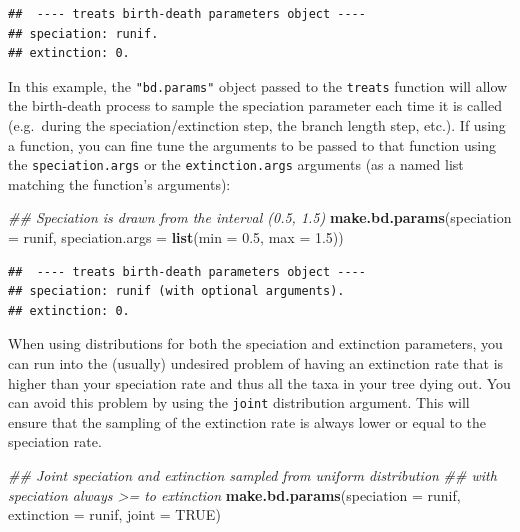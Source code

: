 \documentclass[
]{book}
\newenvironment{Shaded}{\begin{snugshade}}{\end{snugshade}}
\newcommand{\CommentTok}[1]{\textcolor[rgb]{0.56,0.35,0.01}{\textit{#1}}}
\newcommand{\DataTypeTok}[1]{\textcolor[rgb]{0.13,0.29,0.53}{#1}}
\newcommand{\FloatTok}[1]{\textcolor[rgb]{0.00,0.00,0.81}{#1}}
\newcommand{\KeywordTok}[1]{\textcolor[rgb]{0.13,0.29,0.53}{\textbf{#1}}}
\newcommand{\NormalTok}[1]{#1}
\newcommand{\OtherTok}[1]{\textcolor[rgb]{0.56,0.35,0.01}{#1}}
\begin{document}
\begin{verbatim}
##  ---- treats birth-death parameters object ---- 
## speciation: runif.
## extinction: 0.
\end{verbatim}

In this example, the \texttt{"bd.params"} object passed to the \texttt{treats} function will allow the birth-death process to sample the speciation parameter each time it is called (e.g.~during the speciation/extinction step, the branch length step, etc.).
If using a function, you can fine tune the arguments to be passed to that function using the \texttt{speciation.args} or the \texttt{extinction.args} arguments (as a named list matching the function's arguments):

\begin{Shaded}
\begin{Highlighting}[]
\CommentTok{\#\# Speciation is drawn from the interval (0.5, 1.5)}
\KeywordTok{make.bd.params}\NormalTok{(}\DataTypeTok{speciation =}\NormalTok{ runif,}
               \DataTypeTok{speciation.args =} \KeywordTok{list}\NormalTok{(}\DataTypeTok{min =} \FloatTok{0.5}\NormalTok{, }\DataTypeTok{max =} \FloatTok{1.5}\NormalTok{))}
\end{Highlighting}
\end{Shaded}

\begin{verbatim}
##  ---- treats birth-death parameters object ---- 
## speciation: runif (with optional arguments).
## extinction: 0.
\end{verbatim}

When using distributions for both the speciation and extinction parameters, you can run into the (usually) undesired problem of having an extinction rate that is higher than your speciation rate and thus all the taxa in your tree dying out.
You can avoid this problem by using the \texttt{joint} distribution argument.
This will ensure that the sampling of the extinction rate is always lower or equal to the speciation rate.

\begin{Shaded}
\begin{Highlighting}[]
\CommentTok{\#\# Joint speciation and extinction sampled from uniform distribution }
\CommentTok{\#\# with speciation always \textgreater{}= to extinction}
\KeywordTok{make.bd.params}\NormalTok{(}\DataTypeTok{speciation =}\NormalTok{ runif, }\DataTypeTok{extinction =}\NormalTok{ runif, }\DataTypeTok{joint =} \OtherTok{TRUE}\NormalTok{)}
\end{Highlighting}
\end{Shaded}
\end{document}
